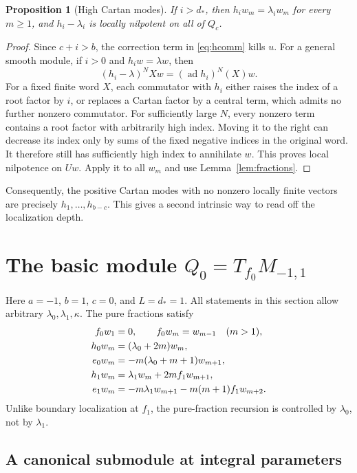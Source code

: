 \documentclass[11pt,a4paper]{article}
\newcommand{\ad}{\operatorname{ad}}
\theoremstyle{plainupright}
\newtheorem{proposition}{Proposition}[section]
\begin{document}
\begin{proposition}[High Cartan modes]\label{prop:high}
If \(i>d_*\), then \(h_iw_m=\lambda_iw_m\) for every \(m\ge1\),
and \(h_i-\lambda_i\) is locally nilpotent on all of \(Q_c\).
\end{proposition}
\begin{proof}
Since \(c+i>b\), the correction term in \eqref{eq:hcomm} kills \(u\).
For a general smooth module, if \(i>0\) and \(h_iw=\lambda w\), then
\[
(h_i-\lambda)^N Xw=(\ad h_i)^N(X)w.
\]
For a fixed finite word \(X\), each commutator with \(h_i\) either raises
the index of a root factor by \(i\), or replaces a Cartan factor by a
central term, which admits no further nonzero commutator.
For sufficiently large \(N\), every nonzero term contains a root factor
with arbitrarily high index. Moving it to the right can decrease its
index only by sums of the fixed negative indices in the original word.
It therefore still has sufficiently high index to annihilate \(w\).
This proves local nilpotence on \(Uw\). Apply it to all \(w_m\) and use
Lemma~\ref{lem:fractions}.
\end{proof}

Consequently, the positive Cartan modes with no nonzero locally finite
vectors are precisely \(h_1,\ldots,h_{b-c}\). This gives a second
intrinsic way to read off the localization depth.

\section{The basic module \texorpdfstring{\(Q_0=T_{f_0}M_{-1,1}\)}{Q0 = T(f0) M(-1,1)}}

Here \(a=-1\), \(b=1\), \(c=0\), and \(L=d_*=1\).
All statements in this section allow arbitrary
\(\lambda_0,\lambda_1,\kappa\). The pure fractions satisfy
\begin{align}
f_0w_1&=0,\qquad f_0w_m=w_{m-1}\quad(m>1),\notag\\
h_0w_m&=(\lambda_0+2m)w_m,\label{eq:basic}\\
e_0w_m&=-m(\lambda_0+m+1)w_{m+1},\label{eq:basic-e}\\
h_1w_m&=\lambda_1w_m+2m f_1w_{m+1},\notag\\
e_1w_m&=-m\lambda_1w_{m+1}-m(m+1)f_1w_{m+2}.\notag
\end{align}
Unlike boundary localization at \(f_1\), the pure-fraction recursion
is controlled by \(\lambda_0\), not by \(\lambda_1\).

\subsection{A canonical submodule at integral parameters}
\end{document}
